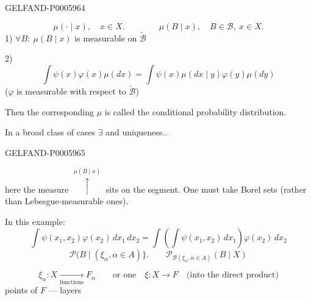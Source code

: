 \begin{GelfandAdjacentEvidence}{GELFAND-P000596}{4}

\[
\mu(\cdot\mid x),\quad x\in X.
\qquad\qquad
\mu(B\mid x),\quad B\in\mathcal B,\ x\in X.
\]
1) \(\forall B:\ \mu(B\mid x)\) is measurable on \(\widetilde{\mathcal B}\)

2)
\[
\int\psi(x)\varphi(x)\mu(dx)=
\int\psi(x)\mu(dx\mid y)\varphi(y)\mu(dy)
\]
(\(\varphi\) is measurable with respect to \(\widetilde{\mathcal B}\))

Then the corresponding \(\mu\) is called the conditional probability distribution.

In a broad class of cases \(\exists\) and uniqueness..

\end{GelfandAdjacentEvidence}
\begin{GelfandAdjacentEvidence}{GELFAND-P000596}{5}

here the measure \(\overset{\mu(B\mid x)}{\uparrow}\) sits on the segment.
One must take Borel sets (rather than Lebesgue-measurable ones).

In this example:
\[
\int\psi(x_1,x_2)\varphi(x_2)\,dx_1\,dx_2
=\int\left(\int\psi(x_1,x_2)\,dx_1\right)\varphi(x_2)\,dx_2
\]
\[
\mathcal P\bigl(B\mid(\xi_\alpha,\alpha\in A)\bigr\}.
\qquad \mathcal P_{\mathcal B(\xi_\alpha,\alpha\in A)}(B\mid X)
\]
\end{GelfandAdjacentEvidence}

\[
\xi_\alpha:X\underset{\text{functions}}{\longrightarrow}F_\alpha
\qquad\text{or one}\quad \xi:X\to F\quad\text{(into the direct product)}
\]
points of \(F\) — layers

